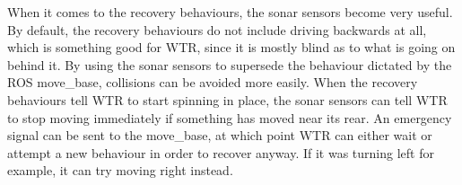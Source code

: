 When it comes to the recovery behaviours, the sonar sensors become very useful.
By default, the recovery behaviours do not include driving backwards at all, which is something good for WTR, since it is mostly blind as to what is going on behind it.
By using the sonar sensors to supersede the behaviour dictated by the ROS move\_base, collisions can be avoided more easily.
When the recovery behaviours tell WTR to start spinning in place, the sonar sensors can tell WTR to stop moving immediately if something has moved near its rear.
An emergency signal can be sent to the move\_base, at which point WTR can either wait or attempt a new behaviour in order to recover anyway.
If it was turning left for example, it can try moving right instead.
\newpage
